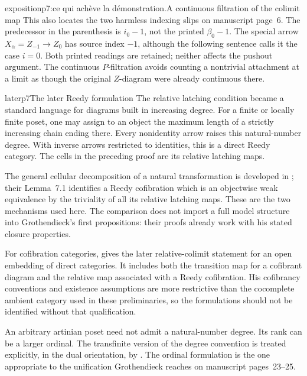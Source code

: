 \begin{dcomment}{exposition}{p7:ce qui achève la démonstration.}{A continuous filtration of the colimit map}
This also locates the two harmless indexing slips on manuscript page~6. The predecessor in the parenthesis is $i_0-1$, not the printed $\beta_0-1$. The special arrow $X_\alpha=Z_{-1}\to Z_0$ has source index $-1$, although the following sentence calls it the case $i=0$. Both printed readings are retained; neither affects the pushout argument. The continuous $P$-filtration avoids counting a nontrivial attachment at a limit as though the original $Z$-diagram were already continuous there.
\end{dcomment}

\begin{dcomment}{later}{p7}{The later Reedy formulation}
The relative latching condition became a standard language for diagrams built in increasing degree. For a finite or locally finite poset, one may assign to an object the maximum length of a strictly increasing chain ending there. Every nonidentity arrow raises this natural-number degree. With inverse arrows restricted to identities, this is a direct Reedy category. The cells in the preceding proof are its relative latching maps.

The general cellular decomposition of a natural transformation is developed in \citet[Proposition~6.3]{RiehlVerity2014Reedy}; their Lemma~7.1 identifies a Reedy cofibration which is an objectwise weak equivalence by the triviality of all its relative latching maps. These are the two mechanisms used here. The comparison does not import a full model structure into Grothendieck's first propositions: their proofs already work with his stated closure properties.

For cofibration categories, \citet[Theorem~9.4.1(1)(a,b)]{RadulescuBanu2009} gives the later relative-colimit statement for an open embedding of direct categories. It includes both the transition map for a cofibrant diagram and the relative map associated with a Reedy cofibration. His cofibrancy conventions and existence assumptions are more restrictive than the cocomplete ambient category used in these preliminaries, so the formulations should not be identified without that qualification.

An arbitrary artinian poset need not admit a natural-number degree. Its rank can be a larger ordinal. The transfinite version of the degree convention is treated explicitly, in the dual orientation, by \citet[Definition~4.6 and Theorem~4.7]{Shulman2015Reedy}. The ordinal formulation is the one appropriate to the unification Grothendieck reaches on manuscript pages~23--25.
\end{dcomment}

